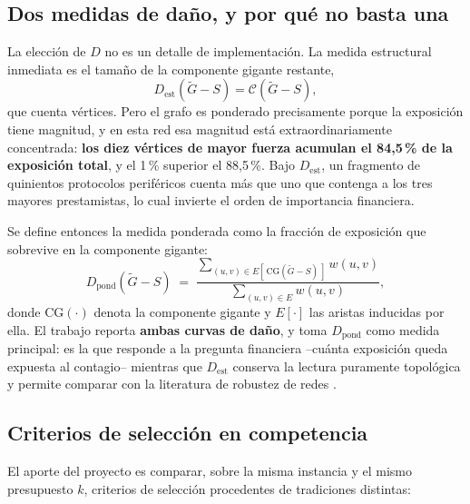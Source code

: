 \documentclass[journal]{IEEEtran}
\begin{document}
\subsection{Dos medidas de daño, y por qué no basta una}

La elección de $D$ no es un detalle de implementación. La medida estructural
inmediata es el tamaño de la componente gigante restante,
\[
D_{\text{est}}(\tilde{G} - S) = \mathcal{C}(\tilde{G} - S),
\]
que cuenta vértices. Pero el grafo es ponderado precisamente porque la exposición
tiene magnitud, y en esta red esa magnitud está extraordinariamente concentrada:
\textbf{los diez vértices de mayor fuerza acumulan el 84{,}5\,\% de la exposición
total}, y el 1\,\% superior el 88{,}5\,\%. Bajo $D_{\text{est}}$, un fragmento de
quinientos protocolos periféricos cuenta más que uno que contenga a los tres
mayores prestamistas, lo cual invierte el orden de importancia financiera.

Se define entonces la medida ponderada como la fracción de exposición que
sobrevive en la componente gigante:
\[
D_{\text{pond}}(\tilde{G} - S) \;=\;
\frac{\displaystyle\sum_{(u,v) \in E[\,\mathrm{CG}(\tilde{G} - S)\,]} w(u,v)}
     {\displaystyle\sum_{(u,v) \in E} w(u,v)},
\]
donde $\mathrm{CG}(\cdot)$ denota la componente gigante y $E[\cdot]$ las aristas
inducidas por ella. El trabajo reporta \textbf{ambas curvas de daño}, y toma
$D_{\text{pond}}$ como medida principal: es la que responde a la pregunta
financiera --cuánta exposición queda expuesta al contagio-- mientras que
$D_{\text{est}}$ conserva la lectura puramente topológica y permite comparar con
la literatura de robustez de redes \cite{albert2000error}.

\subsection{Criterios de selección en competencia}

El aporte del proyecto es comparar, sobre la misma instancia y el mismo
presupuesto $k$, criterios de selección procedentes de tradiciones distintas:
\end{document}
